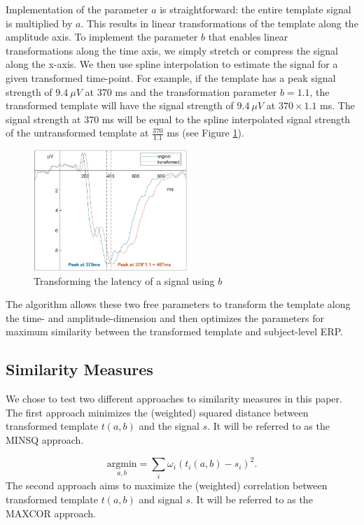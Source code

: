 \documentclass[
  man]{apa7}
\begin{document}
Implementation of the parameter \(a\) is straightforward: the entire template signal is multiplied by \(a\). This results in linear transformations of the template along the amplitude axis. To implement the parameter \(b\) that enables linear transformations along the time axis, we simply stretch or compress the signal along the x-axis. We then use spline interpolation to estimate the signal for a given transformed time-point. For example, if the template has a peak signal strength of \(9.4\ \mu V\) at 370 ms and the transformation parameter \(b = 1.1\), the transformed template will have the signal strength of \(9.4\ \mu V\) at \(370 \times 1.1\) ms. The signal strength at 370 ms will be equal to the spline interpolated signal strength of the untransformed template at \(\frac{370}{1.1}\) ms (see Figure \ref{fig:transformation-example-img}).



\begin{figure}
\includegraphics[width=2.28in]{../images/transformation_example} \caption{Transforming the latency of a signal using \(b\)}\label{fig:transformation-example-img}
\end{figure}

The algorithm allows these two free parameters to transform the template along the time- and amplitude-dimension and then optimizes the parameters for maximum similarity between the transformed template and subject-level ERP.

\hypertarget{similarity-measures}{%
\subsection{Similarity Measures}\label{similarity-measures}}

We chose to test two different approaches to similarity measures in this paper. The first approach minimizes the (weighted) squared distance between transformed template \(t(a, b)\) and the signal \(s\). It will be referred to as the MINSQ approach.

\[\underset{a, b}{\mathrm{argmin}} = \sum_i \omega_i(t_i(a, b) - s_i)^2.\]
The second approach aims to maximize the (weighted) correlation between transformed template \(t(a,b)\) and signal \(s\). It will be referred to as the MAXCOR approach.
\end{document}
